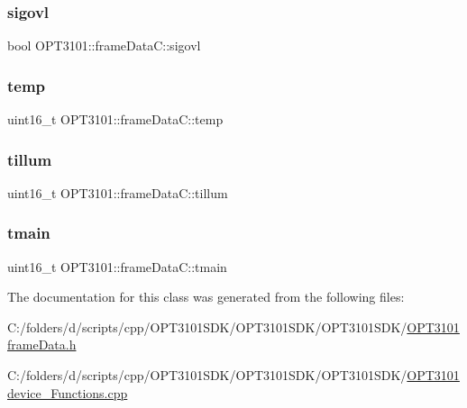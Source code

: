 \subsubsection{\texorpdfstring{sigovl}{sigovl}}
{\footnotesize\ttfamily bool O\+P\+T3101\+::frame\+Data\+C\+::sigovl}

\mbox{\label{class_o_p_t3101_1_1frame_data_c_a9edb9b641158fc09caada374ee941d45}} 
\subsubsection{\texorpdfstring{temp}{temp}}
{\footnotesize\ttfamily uint16\+\_\+t O\+P\+T3101\+::frame\+Data\+C\+::temp}

\mbox{\label{class_o_p_t3101_1_1frame_data_c_ab8de475cc7a584e2c3df93935ffb5601}} 
\subsubsection{\texorpdfstring{tillum}{tillum}}
{\footnotesize\ttfamily uint16\+\_\+t O\+P\+T3101\+::frame\+Data\+C\+::tillum}

\mbox{\label{class_o_p_t3101_1_1frame_data_c_a5c1cd938fc62d4672d15842df1f7f539}} 
\subsubsection{\texorpdfstring{tmain}{tmain}}
{\footnotesize\ttfamily uint16\+\_\+t O\+P\+T3101\+::frame\+Data\+C\+::tmain}



The documentation for this class was generated from the following files\+:\begin{DoxyCompactItemize}
\item 
C\+:/folders/d/scripts/cpp/\+O\+P\+T3101\+S\+D\+K/\+O\+P\+T3101\+S\+D\+K/\+O\+P\+T3101\+S\+D\+K/\mbox{\hyperlink{_o_p_t3101frame_data_8h}{O\+P\+T3101frame\+Data.\+h}}\item 
C\+:/folders/d/scripts/cpp/\+O\+P\+T3101\+S\+D\+K/\+O\+P\+T3101\+S\+D\+K/\+O\+P\+T3101\+S\+D\+K/\mbox{\hyperlink{_o_p_t3101device___functions_8cpp}{O\+P\+T3101device\+\_\+\+Functions.\+cpp}}\end{DoxyCompactItemize}
